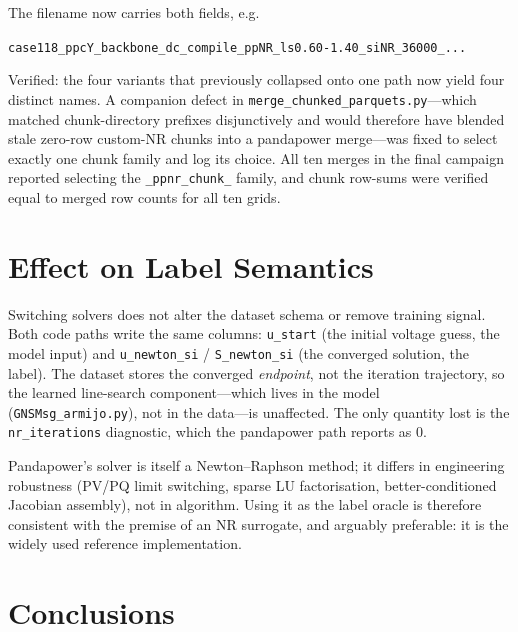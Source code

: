 \documentclass{article}
\begin{document}
The filename now carries both fields, e.g.
\begin{center}
\small
\texttt{case118\_ppcY\_backbone\_dc\_compile\_ppNR\_ls0.60-1.40\_siNR\_36000\_...}
\end{center}
Verified: the four variants that previously collapsed onto one path now yield
four distinct names.  A companion defect in
\texttt{merge\_chunked\_parquets.py}---which matched chunk-directory prefixes
disjunctively and would therefore have blended stale zero-row custom-NR
chunks into a pandapower merge---was fixed to select exactly one chunk family
and log its choice.  All ten merges in the final campaign reported selecting
the \texttt{\_ppnr\_chunk\_} family, and chunk row-sums were verified equal to
merged row counts for all ten grids.


\section{Effect on Label Semantics}

Switching solvers does not alter the dataset schema or remove training
signal.  Both code paths write the same columns: \texttt{u\_start} (the
initial voltage guess, the model input) and \texttt{u\_newton\_si} /
\texttt{S\_newton\_si} (the converged solution, the label).  The dataset
stores the converged \emph{endpoint}, not the iteration trajectory, so the
learned line-search component---which lives in the model
(\texttt{GNSMsg\_armijo.py}), not in the data---is unaffected.  The only
quantity lost is the \texttt{nr\_iterations} diagnostic, which the pandapower
path reports as $0$.

Pandapower's solver is itself a Newton--Raphson method; it differs in
engineering robustness (PV/PQ limit switching, sparse LU factorisation,
better-conditioned Jacobian assembly), not in algorithm.  Using it as the
label oracle is therefore consistent with the premise of an NR surrogate, and
arguably preferable: it is the widely used reference implementation.


\section{Conclusions}
\end{document}
